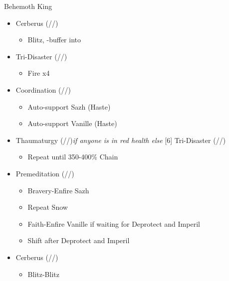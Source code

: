 \begin{multicols}{2}
\renewcommand{\first}{[1] Cerberus (\com/\com/\com)}
\renewcommand{\second}{[2] Cerberus (\com/\com/\com)}
\renewcommand{\third}{[3] Premeditation (\syn/\sen/\sab)}
\renewcommand{\fourth}{[4] Coordination (\syn/\rav/\med)}
\renewcommand{\fifth}{[5] Thaumaturgy (\rav/\rav/\med)}
\renewcommand{\sixth}{[6] Tri-Disaster (\rav/\rav/\rav)}

\begin{battle}{Behemoth King}
  \begin{itemize}
    \item \second
          \begin{itemize}
            \item Blitz, \rav-buffer into
          \end{itemize}
    \item \sixth
          \begin{itemize}
            \item Fire x4
          \end{itemize}
    \item \fourth
          \begin{itemize}
            \item Auto-support Sazh (Haste)
            \item Auto-support Vanille (Haste)
          \end{itemize}
    \item \fifth \textit{if anyone is in red health else} \sixth
          \begin{itemize}
            \item Repeat until 350-400\% Chain
          \end{itemize}
    \item \third
          \begin{itemize}
            \item Bravery-Enfire Sazh
            \item Repeat Snow
            \item Faith-Enfire Vanille if waiting for Deprotect and Imperil
            \item Shift after Deprotect and Imperil
          \end{itemize}
    \item \second
          \begin{itemize}
            \item Blitz-Blitz
          \end{itemize}
  \end{itemize}
\end{battle}
\vfill


\end{multicols}
